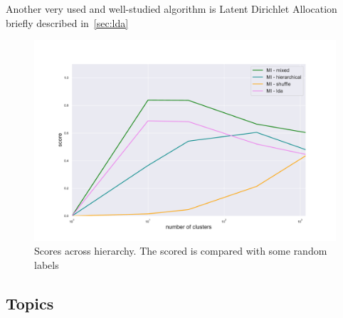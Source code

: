 Another very used and well-studied algorithm is Latent Dirichlet Allocation briefly described in~\ref{sec:lda}
\begin{figure}[htb!]
    \centering
    \includegraphics[width=0.9\linewidth]{pictures/topic/gtex/oversigma_10tissue/metric_scores_all.pdf}
    \caption{Scores across hierarchy. The scored is compared with some random labels}
    \label{fig:topic/gtex/oversigma_10tissue/metric_scores_all}
\end{figure}

\subsection{Topics}

